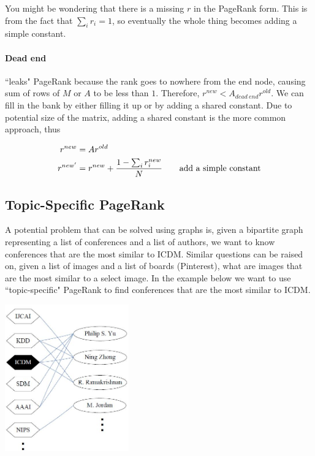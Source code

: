 You might be wondering that there is a missing $r$ in the PageRank form. This is from the fact that $\sum_{i}r_i = 1$, so eventually the whole thing becomes adding a simple constant.

\paragraph{Dead end} ``leaks" PageRank because the rank goes to nowhere from the end node, causing sum of rows of $M$ or $A$ to be less than $1$. Therefore, $r^{new} < A_{dead\ end}r^{old}$. We can fill in the bank by either filling it up or by adding a shared constant. Due to potential size of the matrix, adding a shared constant is the more common approach, thus

\begin{align}
    r^{new} &= Ar^{old} \\
    r^{new'} &= r^{new} + \frac{1 - \sum_{i}r^{new}_i}{N} \text{\qquad add a simple constant}
\end{align}{}

\subsection{Topic-Specific PageRank}

A potential problem that can be solved using graphs is, given a bipartite graph representing a list of conferences and a list of authors, we want to know conferences that are the most similar to ICDM. Similar questions can be raised on, given a list of images and a list of boards (Pinterest), what are images that are the most similar to a select image. In the example below we want to use ``topic-specific" PageRank to find conferences that are the most similar to ICDM.

{
\centering
\includegraphics[width=0.4\textwidth]{notes/img/l11_p58_personalized.JPG} \par
}

